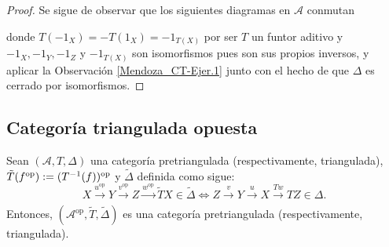 \documentclass[tesis]{subfiles}
\begin{document}
\begin{proof}

    Se sigue de observar que los siguientes diagramas en $\mathscr{A}$ conmutan
    \begin{center}
    \end{center}
    donde $T(-1_X) = -T(1_X) = -1_{T(X)}$ por ser $T$ un funtor aditivo y $-1_X, -1_Y, -1_Z$ y $-1_{T(X)}$ son isomorfismos \textemdash pues son sus propios inversos\textemdash, y aplicar la Observación \ref{Mendoza_CT-Ejer.1} junto con el hecho de que $\Delta$ es cerrado por isomorfismos.
\end{proof}

\subsection*{Categoría triangulada opuesta} \label{Ssec: Categoría triangulada opuesta}

\begin{Prop}\label{Mendoza_CT-Ejer.5}

    Sean $(\mathscr{A},T,\Delta)$ una categoría pretriangulada (respectivamente, triangulada), $\tilde{T}(f^\text{op})\break :=(T^{-1}(f))^\text{op}$ y $\tilde{\Delta}$ definida como sigue:
    \[
    X\xrightarrow[]{u^\text{op}} Y\xrightarrow[]{v^\text{op}} Z\xrightarrow[]{w^\text{op}} \tilde{T}X\in \tilde{\Delta} \iff Z\xrightarrow[]{v} Y\xrightarrow[]{u} X\xrightarrow[]{Tw} TZ\in\Delta.
    \] 
    Entonces, $(\mathscr{A}^\text{op},\tilde{T},\tilde{\Delta})$ es una categoría pretriangulada (respectivamente, triangulada).
\end{Prop}
\end{document}
